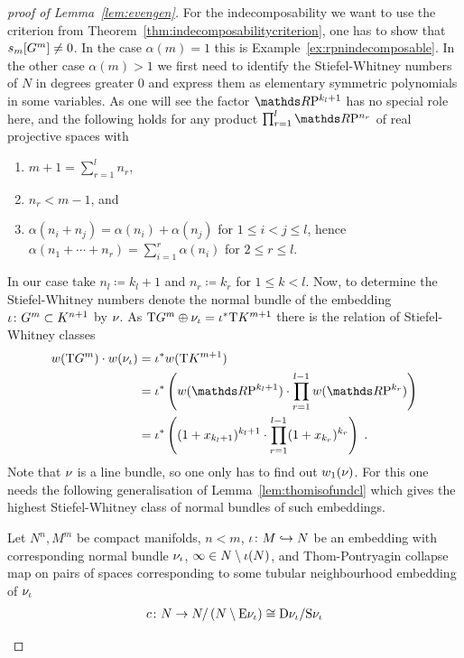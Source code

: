 \begin{proof}[proof of
  Lemma~\ref{lem:evengen}]
  For the indecomposability we want to use the criterion from
  Theorem~\ref{thm:indecomposabilitycriterion}, \idest one has to show
  that $s_{m}[G^{m}]\neq 0$.
  In the case $\alpha(m)=1$ this is Example~\ref{ex:rpnindecomposable}.
  In the other case $\alpha(m)>1$ we first need to identify the
  Stiefel-Whitney numbers of $N$ in degrees greater 0 and express them
  as elementary symmetric polynomials in some variables.
  As one will see the factor $\RP{k_l+1}$ has no special role here,
  and the following holds for any product $\prod_{r=1}^{l}\RP{n_r}$ of
  real projective spaces with
  \begin{enumerate}
  \item $m+1=\sum_{r=1}^l n_r$,
  \item $n_r<m-1$, and
  \item $\alpha(n_i+n_j)=\alpha(n_i)+\alpha(n_j)$
    for $1\leq i<j\leq l$,
    hence $\alpha(n_1+\dotsb+n_r)=\sum_{i=1}^{r}\alpha(n_i)$
    for $2\leq r\leq l$.
  \end{enumerate}
  In our case take $n_l\coloneqq k_l+1$ and 
  $n_r\coloneqq k_r$ for $1\leq k<l$.
  Now, to determine the Stiefel-Whitney numbers 
  denote the normal bundle of the embedding
  ${\iota}\colon G^{m}\subset K^{n+1}$ by $\nu_{}$. 
  As $\mathrm{T}G^{m}\oplus\nu_{{\iota}}={{\iota}}^*\mathrm{T}K^{m+1}$ there is the relation
  of Stiefel-Whitney classes
  \begin{align*}
    \W{\T{\G m}} \cdot \W{\N\emb}
    &= \pb\emb\W{\T{K^{m+1}}} \\
    &= \pb\emb\left(
      \W{\RP{k_l+1}}
      \cdot \prod_{r=1}^{l-1}\W{\RP{k_r}}
      \right) \\
    &= \pb\emb\left(
      (1+x_{k_l+1})^{k_l+1}
      \cdot \prod_{r=1}^{l-1}(1+x_{k_r})^{k_r}
      \right)
      \;.
  \end{align*}
  Note that $\nu_{}$ is a line bundle, so one only has to find out
  ${w_{1}}(\nu_{})$. For this one needs the following
  generalisation of Lemma~\ref{lem:thomisofundcl} which gives the
  highest Stiefel-Whitney class of normal bundles of such embeddings.
  \begin{Lem}
    Let $N^n, M^m$ be compact manifolds, $n<m$,
    ${\iota}\colon M\hookrightarrow N$ be an embedding with corresponding normal
    bundle $\nu_{{\iota}}$, $\infty\in N\setminus{\iota}(N)$, and
    Thom-Pontryagin collapse map on pairs of spaces corresponding to
    some tubular neighbourhood embedding of $\nu_{{\iota}}$
    \begin{gather*}
      \collapse\colon
      N
      \to N/\left( N\setminus \E{\N{\emb}} \right)
      \cong \Discbdl{\N{\emb}} / \Spherebdl{\N{\emb}}

\end{gather*}
\end{Lem}
\end{proof}
